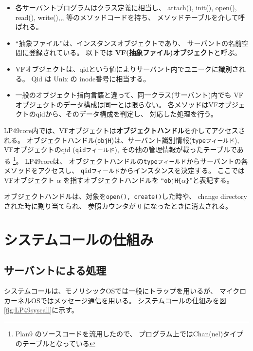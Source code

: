 \documentclass{ipsjpapers}
\begin{document}
\begin{itemize}
\item  各サーバントプログラムはクラス定義に相当し、
  attach(), init(), open(), read(), write(),,, 等のメソッドコードを持ち、
  メソッドテーブルを介して呼ばれる。
\item  ``抽象ファイル''は、インスタンスオブジェクトであり、
   サーバントの名前空間に登録されている。
   以下では {\bf VF(抽象ファイル)オブジェクト}と呼ぶ。

\item  VFオブジェクトは、qidという値によりサーバント内でユニークに識別される。
       Qid は Unix の inode番号に相当する。

\item  一般のオブジェクト指向言語と違って、同一クラス(サーバント)内でも
       VFオブジェクトのデータ構成は同一とは限らない。
       各メソッドはVFオブジェクトのqidから、そのデータ構成を判定し、
       対応した処理を行う。

\end{itemize}


  LP49core内では、VFオブジェクトは{\bf オブジェクトハンドル}を介してアクセスされる。
オブジェクトハンドル({\tt objH})は、サーバント識別情報({\tt typeフィールド}), 
VFオブジェクトのqid ({\tt qidフィールド}), 
その他の管理情報が載ったテーブルである
\footnote{ Plan9 のソースコードを流用したので、
プログラム上ではChan(nel)タイプのテーブルとなっている}。
LP49coreは、
オブジェクトハンドルの{\tt typeフィールド}からサーバントの各メソッドをアクセスし、
{\tt qidフィールド}からインスタンスを決定する。
%
ここではVFオブジェクト $\alpha$ を指すオブジェクトハンドルを
``{\tt objH\{$\alpha$\}}''と表記する。

オブジェクトハンドルは、対象を{\tt open(), create()}した時や、
change directory された時に割り当てられ、
参照カウンタが 0 になったときに消去される。




\section{システムコールの仕組み}

\subsection{サーバントによる処理}

  システムコールは、モノリシックOSでは一般にトラップを用いるが、
マイクロカーネルOSではメッセージ通信を用いる。
システムコールの仕組みを図 \ref{fig:LP49syscall}に示す。
\end{document}
